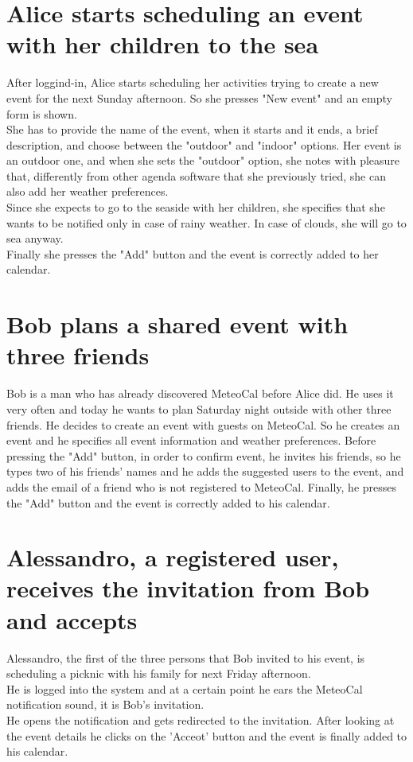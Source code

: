 \documentclass[12pt]{book}
\begin{document}
\section{Alice starts scheduling an event with her children to the sea}
After loggind-in, Alice starts scheduling her activities trying to create a new event for the next Sunday afternoon. So she presses "New event" and an empty form is shown.\\
She has to provide the name of the event, when it starts and it ends, a brief description, and choose between the "outdoor" and "indoor" options. Her event is an outdoor one, and when she sets the "outdoor" option, she notes with pleasure that, differently from other agenda software that she previously tried, she can also add her weather preferences. \\Since she expects to go to the seaside with her children, she specifies that she wants to be notified only in case of rainy weather. In case of clouds, she will go to sea anyway.\\
Finally she presses the "Add" button and the event is correctly added to her calendar.\\

\section{Bob plans a shared event with three friends}
Bob is a man who has already discovered MeteoCal before Alice did. He uses it very often and today he wants to plan Saturday night outside with other three friends. He decides to create an event with guests on MeteoCal. So he creates an event and he specifies all event information and weather preferences. Before pressing the "Add" button, in order to confirm event, he invites his friends, so he types two of his friends' names  and he adds the suggested users to the event, and adds the email of a friend who is not registered to MeteoCal. Finally, he presses the "Add" button and the event is correctly added to his calendar. \\

\section{Alessandro, a registered user, receives the invitation from Bob and accepts}
Alessandro, the first of the three persons that Bob invited to his event, is scheduling a picknic with his family for next Friday afternoon.\\ He is logged into the system and at a certain point he ears the MeteoCal notification sound, it is Bob's invitation. \\
He opens the notification and gets redirected to the invitation. After looking at the event details he clicks on the 'Acceot' button and the event is finally added to his calendar. 
\end{document}
